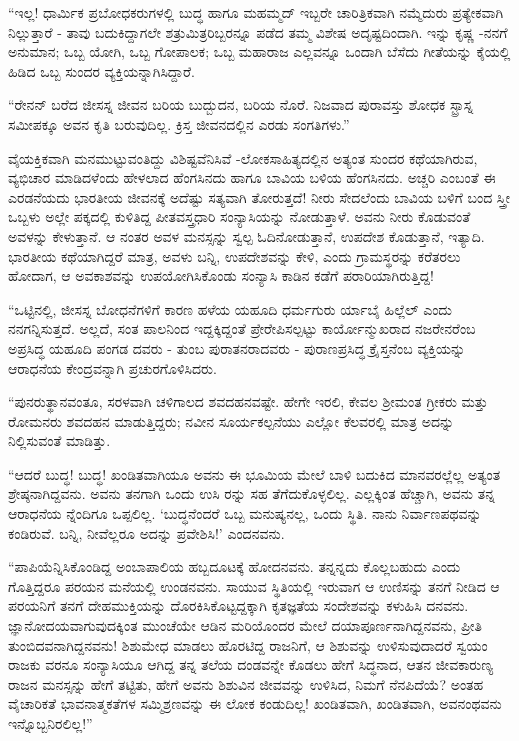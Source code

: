 “ಇಲ್ಲ! ಧಾರ್ಮಿಕ ಪ್ರಬೋಧಕರುಗಳಲ್ಲಿ ಬುದ್ಧ ಹಾಗೂ ಮಹಮ್ಮದ್ ಇಬ್ಬರೇ ಚಾರಿತ್ರಿಕವಾಗಿ ನಮ್ಮೆದುರು ಪ್ರತ್ಯೇಕವಾಗಿ ನಿಲ್ಲುತ್ತಾರೆ - ತಾವು ಬದುಕಿದ್ದಾಗಲೇ ಶತ್ರುಮಿತ್ರರಿಬ್ಬರನ್ನೂ ಪಡೆದ ತಮ್ಮ ವಿಶೇಷ ಅದೃಷ್ಟದಿಂದಾಗಿ. ಇನ್ನು ಕೃಷ್ಣ -ನನಗೆ ಅನುಮಾನ; ಒಬ್ಬ ಯೋಗಿ, ಒಬ್ಬ ಗೋಪಾಲಕ; ಒಬ್ಬ ಮಹಾರಾಜ ಎಲ್ಲವನ್ನೂ ಒಂದಾಗಿ ಬೆಸೆದು ಗೀತೆಯನ್ನು ಕೈಯಲ್ಲಿ ಹಿಡಿದ ಒಬ್ಬ ಸುಂದರ ವ್ಯಕ್ತಿಯನ್ನಾಗಿಸಿದ್ದಾರೆ.

“ರೇನನ್ ಬರೆದ ಜೀಸಸ್ನ ಜೀವನ ಬರಿಯ ಬುದ್ಬುದನ, ಬರಿಯ ನೊರೆ. ನಿಜವಾದ ಪುರಾವಸ್ತು ಶೋಧಕ ಸ್ಟ್ರಾಸ್ನ ಸಮೀಪಕ್ಕೂ ಅವನ ಕೃತಿ ಬರುವುದಿಲ್ಲ. ಕ್ರಿಸ್ತ ಜೀವನದಲ್ಲಿನ ಎರಡು ಸಂಗತಿಗಳು.”

ವೈಯಕ್ತಿಕವಾಗಿ ಮನಮುಟ್ಟುವಂತಿದ್ದು ವಿಶಿಷ್ಟವೆನಿಸಿವೆ -ಲೋಕಸಾಹಿತ್ಯದಲ್ಲಿನ ಅತ್ಯಂತ ಸುಂದರ ಕಥೆಯಾಗಿರುವ, ವ್ಯಭಿಚಾರ ಮಾಡಿದಳೆಂದು ಹೇಳಲಾದ ಹೆಂಗಸಿನದು ಹಾಗೂ ಬಾವಿಯ ಬಳಿಯ ಹೆಂಗಸಿನದು. ಅಚ್ಚರಿ ಎಂಬಂತೆ ಈ ಎರಡನೆಯದು ಭಾರತೀಯ ಜೀವನಕ್ಕೆ ಅದೆಷ್ಟು ಸತ್ಯವಾಗಿ ತೋರುತ್ತದೆ! ನೀರು ಸೇದಲೆಂದು ಬಾವಿಯ ಬಳಿಗೆ ಬಂದ ಸ್ತ್ರೀ ಒಬ್ಬಳು ಅಲ್ಲೇ ಪಕ್ಕದಲ್ಲಿ ಕುಳಿತಿದ್ದ ಪೀತವಸ್ತ್ರಧಾರಿ ಸಂನ್ಯಾಸಿಯನ್ನು ನೋಡುತ್ತಾಳೆ. ಅವನು ನೀರು ಕೊಡುವಂತೆ ಅವಳನ್ನು ಕೇಳುತ್ತಾನೆ. ಆ ನಂತರ ಅವಳ ಮನಸ್ಸನ್ನು ಸ್ವಲ್ಪ ಓದಿನೋಡುತ್ತಾನೆ, ಉಪದೇಶ ಕೊಡುತ್ತಾನೆ, ಇತ್ಯಾದಿ. ಭಾರತೀಯ ಕಥೆಯಾಗಿದ್ದರೆ ಮಾತ್ರ, ಅವಳು ಬನ್ನಿ, ಉಪದೇಶವನ್ನು ಕೇಳಿ, ಎಂದು ಗ್ರಾಮಸ್ಥರನ್ನು ಕರೆತರಲು ಹೋದಾಗ, ಆ ಅವಕಾಶವನ್ನು ಉಪಯೋಗಿಸಿಕೊಂಡು ಸಂನ್ಯಾಸಿ ಕಾಡಿನ ಕಡೆಗೆ ಪರಾರಿಯಾಗಿರುತ್ತಿದ್ದ!

“ಒಟ್ಟಿನಲ್ಲಿ, ಜೀಸಸ್ನ ಬೋಧನೆಗಳಿಗೆ ಕಾರಣ ಹಳೆಯ ಯಹೂದಿ ಧರ್ಮಗುರು ರ್ಯಾಬೈ ಹಿಲ್ಲೆಲ್ ಎಂದು ನನಗನ್ನಿಸುತ್ತದೆ. ಅಲ್ಲದೆ, ಸಂತ ಪಾಲನಿಂದ ಇದ್ದಕ್ಕಿದ್ದಂತೆ ಪ್ರೇರೇಪಿಸಲ್ಪಟ್ಟು ಕಾರ್ಯೋನ್ಮುಖರಾದ ನಜರೇನರೆಂಬ ಅಪ್ರಸಿದ್ಧ ಯಹೂದಿ ಪಂಗಡ ದವರು - ತುಂಬ ಪುರಾತನರಾದವರು - ಪುರಾಣಪ್ರಸಿದ್ಧ ಕ್ರೈಸ್ತನೆಂಬ ವ್ಯಕ್ತಿಯನ್ನು ಆರಾಧನೆಯ ಕೇಂದ್ರವನ್ನಾಗಿ ಪ್ರಚುರಗೊಳಿಸಿದರು.

“ಪುನರುತ್ಥಾನವಂತೂ, ಸರಳವಾಗಿ ಚಳಿಗಾಲದ ಶವದಹನವಷ್ಟೇ. ಹೇಗೇ ಇರಲಿ, ಕೇವಲ ಶ‍್ರೀಮಂತ ಗ್ರೀಕರು ಮತ್ತು ರೋಮನರು ಶವದಹನ ಮಾಡುತ್ತಿದ್ದರು; ನವೀನ ಸೂರ್ಯಕಲ್ಪನೆಯು ಎಲ್ಲೋ ಕೆಲವರಲ್ಲಿ ಮಾತ್ರ ಅದನ್ನು ನಿಲ್ಲಿಸುವಂತೆ ಮಾಡಿತ್ತು.

“ಆದರೆ ಬುದ್ಧ! ಬುದ್ಧ! ಖಂಡಿತವಾಗಿಯೂ ಅವನು ಈ ಭೂಮಿಯ ಮೇಲೆ ಬಾಳಿ ಬದುಕಿದ ಮಾನವರಲ್ಲೆಲ್ಲ ಅತ್ಯಂತ ಶ್ರೇಷ್ಠನಾಗಿದ್ದವನು. ಅವನು ತನಗಾಗಿ ಒಂದು ಉಸಿ ರನ್ನು ಸಹ ತೆಗೆದುಕೊಳ್ಳಲಿಲ್ಲ. ಎಲ್ಲಕ್ಕಿಂತ ಹೆಚ್ಚಾಗಿ, ಅವನು ತನ್ನ ಆರಾಧನೆಯ ನ್ನೆಂದಿಗೂ ಒಪ್ಪಲಿಲ್ಲ. ‘ಬುದ್ಧನೆಂದರೆ ಒಬ್ಬ ಮನುಷ್ಯನಲ್ಲ, ಒಂದು ಸ್ಥಿತಿ. ನಾನು ನಿರ್ವಾಣಪಥವನ್ನು ಕಂಡಿರುವೆ. ಬನ್ನಿ, ನೀವೆಲ್ಲರೂ ಅದನ್ನು ಪ್ರವೇಶಿಸಿ!’ ಎಂದನವನು.

“ಪಾಪಿಯೆನ್ನಿಸಿಕೊಂಡಿದ್ದ ಅಂಬಾಪಾಲಿಯ ಹಬ್ಬದೂಟಕ್ಕೆ ಹೋದನವನು. ತನ್ನನ್ನದು ಕೊಲ್ಲಬಹುದು ಎಂದು ಗೊತ್ತಿದ್ದರೂ ಪರಯನ ಮನೆಯಲ್ಲಿ ಉಂಡನವನು. ಸಾಯುವ ಸ್ಥಿತಿಯಲ್ಲಿ ಇರುವಾಗ ಆ ಉಣಿಸನ್ನು ತನಗೆ ನೀಡಿದ ಆ ಪರಯನಿಗೆ ತನಗೆ ದೇಹಮುಕ್ತಿಯನ್ನು ದೊರಕಿಸಿಕೊಟ್ಟದ್ದಕ್ಕಾಗಿ ಕೃತಜ್ಞತೆಯ ಸಂದೇಶವನ್ನು ಕಳುಹಿಸಿ ದನವನು. ಜ್ಞಾನೋದಯವಾಗುವುದಕ್ಕಿಂತ ಮುಂಚೆಯೇ ಆಡಿನ ಮರಿಯೊಂದರ ಮೇಲೆ ದಯಾಪೂರ್ಣನಾಗಿದ್ದನವನು, ಪ್ರೀತಿ ತುಂಬಿದವನಾಗಿದ್ದನವನು! ಶಿಶುಮೇಧ ಮಾಡಲು ಹೊರಟಿದ್ದ ರಾಜನಿಗೆ, ಆ ಶಿಶುವನ್ನು ಉಳಿಸುವುದಾದರೆ ಸ್ವಯಂ ರಾಜಕು ವರನೂ ಸಂನ್ಯಾಸಿಯೂ ಆಗಿದ್ದ ತನ್ನ ತಲೆಯ ದಂಡವನ್ನೇ ಕೊಡಲು ಹೇಗೆ ಸಿದ್ಧನಾದ, ಆತನ ಜೀವಕಾರುಣ್ಯ ರಾಜನ ಮನಸ್ಸನ್ನು ಹೇಗೆ ತಟ್ಟಿತು, ಹೇಗೆ ಅವನು ಶಿಶುವಿನ ಜೀವವನ್ನು ಉಳಿಸಿದ, ನಿಮಗೆ ನೆನಪಿದೆಯೆ? ಅಂತಹ ವೈಚಾರಿಕತೆ ಭಾವನಾತ್ಮಕತೆಗಳ ಸಮ್ಮಿಶ್ರಣವನ್ನು ಈ ಲೋಕ ಕಂಡುದಿಲ್ಲ! ಖಂಡಿತವಾಗಿ, ಖಂಡಿತವಾಗಿ, ಅವನಂಥವನು ಇನ್ನೊಬ್ಬನಿರಲಿಲ್ಲ!”

